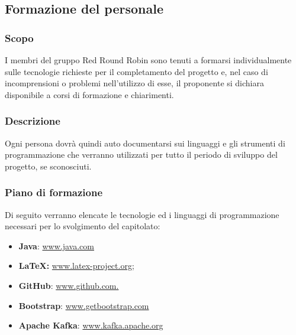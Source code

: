 \subsection{Formazione del personale}

	\subsubsection{Scopo}
		I membri del gruppo Red Round Robin sono tenuti a formarsi individualmente sulle tecnologie richieste per il completamento del progetto e, nel caso di incomprensioni o problemi nell'utilizzo di esse, il proponente si dichiara disponibile a corsi di formazione e chiarimenti.
		
	\subsubsection{Descrizione}
		Ogni persona dovrà quindi auto documentarsi sui linguaggi e gli strumenti di programmazione che verranno utilizzati per tutto il periodo di sviluppo del progetto, se sconosciuti.
		
	\subsubsection{Piano di formazione}
		Di seguito verranno elencate le tecnologie ed i linguaggi di programmazione necessari per lo svolgimento del capitolato:
		\begin{itemize}
			\item \textbf{Java}: \href{https://www.java.com/}{www.java.com}
			\item \textbf{\LaTeX{}:} \href{www.latex-project.org}{www.latex-project.org;}
			\item \textbf{GitHub}: \href{www.github.com}{www.github.com.}
			\item \textbf{Bootstrap}: \href{https://getbootstrap.com/}{www.getbootstrap.com}
			\item \textbf{Apache Kafka}: \href{https://kafka.apache.org/}{www.kafka.apache.org}
		\end{itemize}

